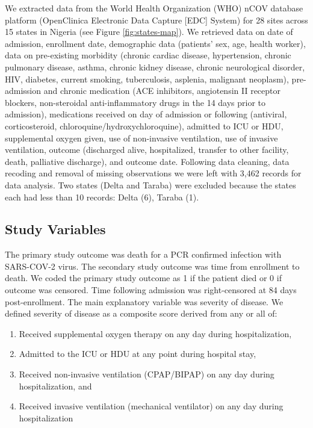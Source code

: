 \documentclass[
  10pt,
]{article}
\providecommand{\tightlist}{%
  \setlength{\itemsep}{0pt}\setlength{\parskip}{0pt}}
\begin{document}
We extracted data from the World Health Organization (WHO) nCOV database
platform (OpenClinica Electronic Data Capture {[}EDC{]} System) for 28
sites across 15 states in Nigeria (see Figure \ref{fig:states-map}). We
retrieved data on date of admission, enrollment date, demographic data
(patients' sex, age, health worker), data on pre-existing morbidity
(chronic cardiac disease, hypertension, chronic pulmonary disease,
asthma, chronic kidney disease, chronic neurological disorder, HIV,
diabetes, current smoking, tuberculosis, asplenia, malignant neoplasm),
pre-admission and chronic medication (ACE inhibitors, angiotensin II
receptor blockers, non-steroidal anti-inflammatory drugs in the 14 days
prior to admission), medications received on day of admission or
following (antiviral, corticosteroid, chloroquine/hydroxychloroquine),
admitted to ICU or HDU, supplemental oxygen given, use of non-invasive
ventilation, use of invasive ventilation, outcome (discharged alive,
hospitalized, transfer to other facility, death, palliative discharge),
and outcome date. Following data cleaning, data recoding and removal of
missing observations we were left with 3,462 records for data analysis.
Two states (Delta and Taraba) were excluded because the states each had
less than 10 records: Delta (6), Taraba (1).

\hypertarget{study-variables}{%
\subsection{Study Variables}\label{study-variables}}

The primary study outcome was death for a PCR confirmed infection with
SARS-COV-2 virus. The secondary study outcome was time from enrollment
to death. We coded the primary study outcome as 1 if the patient died or
0 if outcome was censored. Time following admission was right-censored
at 84 days post-enrollment. The main explanatory variable was severity
of disease. We defined severity of disease as a composite score derived
from any or all of:

\begin{enumerate}
\def\labelenumi{\arabic{enumi}.}
\tightlist
\item
  Received supplemental oxygen therapy on any day during
  hospitalization,
\item
  Admitted to the ICU or HDU at any point during hospital stay,
\item
  Received non-invasive ventilation (CPAP/BIPAP) on any day during
  hospitalization, and
\item
  Received invasive ventilation (mechanical ventilator) on any day
  during hospitalization
\end{enumerate}
\end{document}
